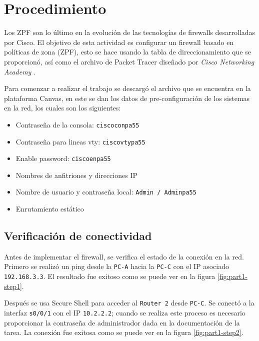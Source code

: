 \documentclass[11pt]{article}
\begin{document}
    \section{Procedimiento}

        Los ZPF son lo último en la evolución de las tecnologías de firewalls desarrolladas por Cisco. El objetivo de esta actividad es configurar un firewall basado en políticas de zona (ZPF), esto se hace usando la tabla de direccionamiento que se proporcionó, así como el archivo de Packet Tracer diseñado por \emph{Cisco Networking Academy} \cite{security-2018}.

        Para comenzar a realizar el trabajo se descargó el archivo que se encuentra en la plataforma Canvas, en este se dan los datos de pre-configuración de los sistemas en la red, los cuales son los siguientes: 
        
        \begin{itemize}
            \item Contraseña de la consola: \texttt{ciscoconpa55}
            \item Contraseña para lineas vty: \texttt{ciscovtypa55}
            \item Enable password: \texttt{ciscoenpa55}
            \item Nombres de anfitriones y direcciones IP
            \item Nombre de usuario y contraseña local: \texttt{Admin / Adminpa55}
            \item Enrutamiento estático
        \end{itemize}

        \subsection{Verificación de conectividad}

            Antes de implementar el firewall, se verifica el estado de la conexión en la red. Primero se realizó un ping desde la \texttt{PC-A} hacia la \texttt{PC-C} con el IP asociado \texttt{192.168.3.3}. El resultado fue exitoso como se puede ver en la figura \ref{fig:part1-step1}.

            Después se usa Secure Shell para acceder al \texttt{Router 2} desde \texttt{PC-C}. Se conectó a la interfaz \texttt{s0/0/1} con el IP \texttt{10.2.2.2}; cuando se realiza este proceso es necesario proporcionar la contraseña de administrador dada en la documentación de la tarea. La conexión fue exitosa como se puede ver en la figura \ref{fig:part1-step2}.
\end{document}
